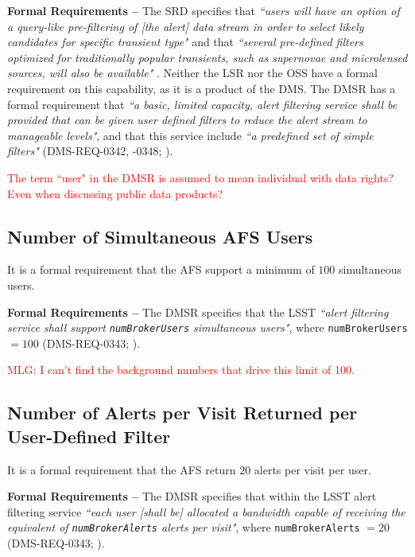 \documentclass[DM,authoryear,toc]{lsstdoc}
\begin{document}
{\bf Formal Requirements --} The SRD specifies that {\it ``users will have an option of a query-like pre-filtering of [the alert] data stream in order to select likely candidates for specific transient type"} and that {\it ``several pre-defined filters optimized for traditionally popular transients, such as supernovae and microlensed sources, will also be available"} . Neither the LSR nor the OSS have a formal requirement on this capability, as it is a product of the DMS. The DMSR has a formal requirement that {\it ``a basic, limited capacity, alert filtering service shall be provided that can be given user defined filters to reduce the alert stream to manageable levels"}, and that this service include {\it ``a predefined set of simple filters"} (DMS-REQ-0342, -0348; ). 

\textcolor{red}{The term ``user" in the DMSR is assumed to mean individual with data rights? Even when discussing public data products?}


\subsection{Number of Simultaneous AFS Users}\label{ssec:AFS_users}

It is a formal requirement that the AFS support a minimum of $100$ simultaneous users.

{\bf Formal Requirements --} The DMSR specifies that the LSST {\it ``alert filtering service shall support {\tt numBrokerUsers} simultaneous users"}, where {\tt numBrokerUsers} $=100$ (DMS-REQ-0343; ).

\textcolor{red}{MLG: I can't find the background numbers that drive this limit of 100.}

\subsection{Number of Alerts per Visit Returned per User-Defined Filter}\label{ssec:AFS_returns}

It is a formal requirement that the AFS return $20$ alerts per visit per user.

{\bf Formal Requirements --} The DMSR specifies that within the LSST alert filtering service {\it ``each user [shall be] allocated a bandwidth capable of receiving the equivalent of {\tt numBrokerAlerts} alerts per visit"}, where {\tt numBrokerAlerts} $=20$ (DMS-REQ-0343; ).
\end{document}
